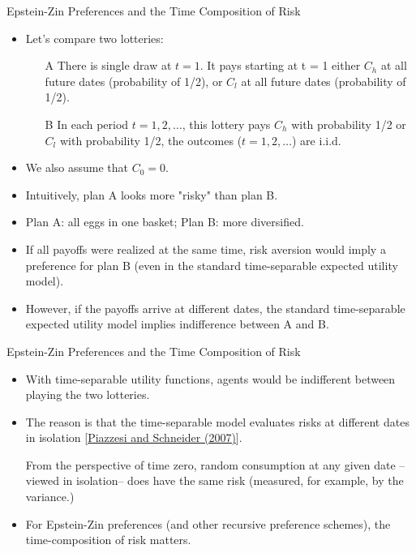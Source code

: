 \begin{frame}{Epstein-Zin Preferences and the Time Composition of Risk}\label{slide:lotteries}
\begin{footnotesize}
\begin{itemize}
	\item Let's compare two lotteries:
	\begin{itemize}
		\item[A] There is single draw at $t=1$. It pays starting at t = 1 either $C_h$ at all future dates (probability of 1/2), or $C_l$ at all future dates (probability of 1/2).
		\item[B] In each period $t = 1, 2, \dots$, this lottery pays $C_h$ with probability 1/2 or $C_l$ with probability 1/2, the outcomes ($t = 1, 2, \dots$) are i.i.d.
	\end{itemize}
	\item We also assume that $C_0=0$.
	\item Intuitively, plan A looks more "risky" than plan B.
	\item Plan A: all eggs in one basket; Plan B: more diversified.
	\item If all payoffs were realized at the same time, risk aversion would imply a preference for plan B (even in the standard time-separable expected utility model).
	\item However, if the payoffs arrive at different dates, the standard time-separable expected utility model implies indifference between A and B. 
\end{itemize}
\end{footnotesize}
\end{frame}


\begin{frame}{Epstein-Zin Preferences and the Time Composition of Risk}
\begin{footnotesize}
\begin{remark}
\begin{itemize}
	\item With time-separable utility functions, agents would be indifferent between playing the two lotteries.
	\item The reason is that the time-separable model evaluates risks at different dates in isolation [\href{http://www.nber.org/chapters/c11182.pdf}{Piazzesi and Schneider (2007)}].
	
	From the perspective of time zero, random consumption at any given date --viewed in isolation-- does have the same risk (measured, for example, by the variance.)
	\item For Epstein-Zin preferences (and other recursive preference schemes), {\color{blue}the time-composition of risk matters}.
\end{itemize}
\end{remark}
\end{footnotesize}
\end{frame}

